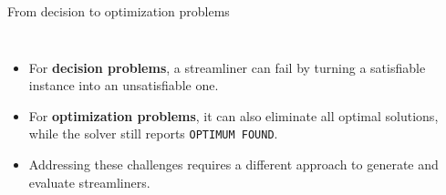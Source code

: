 \documentclass[10pt,aspectratio=169]{beamer}
\begin{document}
 

\begin{frame}{From decision to optimization problems}
\begin{columns}[c,onlytextwidth]
\begin{itemize}\setlength{\itemsep}{6pt}
\item For \textbf{decision problems}, a streamliner can fail by turning a satisfiable instance into an unsatisfiable one.
\item For \textbf{optimization problems}, it can also \alert{eliminate all optimal solutions}, while the solver still reports \texttt{OPTIMUM FOUND}.

\item Addressing these challenges requires a different approach to generate and evaluate streamliners.
\end{itemize}



\end{columns}
\end{frame}
\end{document}

